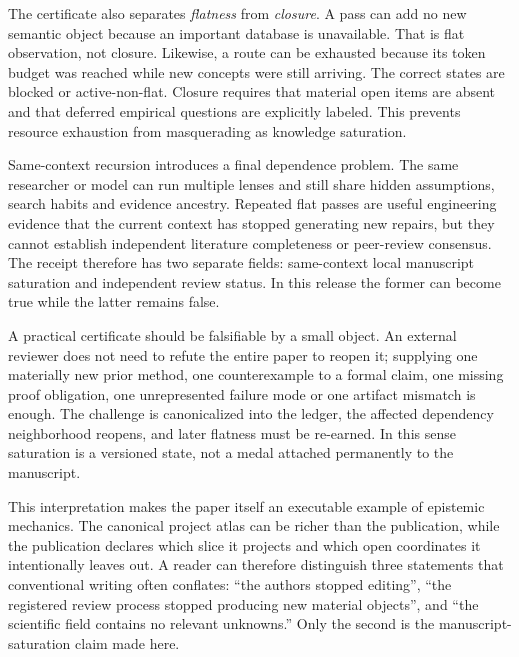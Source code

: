 The certificate also separates \emph{flatness} from \emph{closure}. A pass can add no new semantic object because an important database is unavailable. That is flat observation, not closure. Likewise, a route can be exhausted because its token budget was reached while new concepts were still arriving. The correct states are blocked or active-non-flat. Closure requires that material open items are absent and that deferred empirical questions are explicitly labeled. This prevents resource exhaustion from masquerading as knowledge saturation.

Same-context recursion introduces a final dependence problem. The same researcher or model can run multiple lenses and still share hidden assumptions, search habits and evidence ancestry. Repeated flat passes are useful engineering evidence that the current context has stopped generating new repairs, but they cannot establish independent literature completeness or peer-review consensus. The receipt therefore has two separate fields: same-context local manuscript saturation and independent review status. In this release the former can become true while the latter remains false.

A practical certificate should be falsifiable by a small object. An external reviewer does not need to refute the entire paper to reopen it; supplying one materially new prior method, one counterexample to a formal claim, one missing proof obligation, one unrepresented failure mode or one artifact mismatch is enough. The challenge is canonicalized into the ledger, the affected dependency neighborhood reopens, and later flatness must be re-earned. In this sense saturation is a versioned state, not a medal attached permanently to the manuscript.

This interpretation makes the paper itself an executable example of epistemic mechanics. The canonical project atlas can be richer than the publication, while the publication declares which slice it projects and which open coordinates it intentionally leaves out. A reader can therefore distinguish three statements that conventional writing often conflates: ``the authors stopped editing'', ``the registered review process stopped producing new material objects'', and ``the scientific field contains no relevant unknowns.'' Only the second is the manuscript-saturation claim made here.
